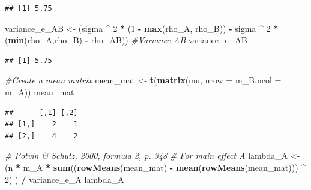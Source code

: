 \documentclass[
]{book}
\newenvironment{Shaded}{\begin{snugshade}}{\end{snugshade}}
\newcommand{\CommentTok}[1]{\textcolor[rgb]{0.56,0.35,0.01}{\textit{#1}}}
\newcommand{\DataTypeTok}[1]{\textcolor[rgb]{0.13,0.29,0.53}{#1}}
\newcommand{\DecValTok}[1]{\textcolor[rgb]{0.00,0.00,0.81}{#1}}
\newcommand{\KeywordTok}[1]{\textcolor[rgb]{0.13,0.29,0.53}{\textbf{#1}}}
\newcommand{\NormalTok}[1]{#1}
\newcommand{\OperatorTok}[1]{\textcolor[rgb]{0.81,0.36,0.00}{\textbf{#1}}}
\newcommand{\StringTok}[1]{\textcolor[rgb]{0.31,0.60,0.02}{#1}}
\begin{document}
\begin{verbatim}
## [1] 5.75
\end{verbatim}

\begin{Shaded}
\begin{Highlighting}[]
\NormalTok{variance_e_AB <-}
\StringTok{  }\NormalTok{(sigma }\OperatorTok{^}\StringTok{ }\DecValTok{2} \OperatorTok{*}\StringTok{ }\NormalTok{(}\DecValTok{1} \OperatorTok{-}\StringTok{ }\KeywordTok{max}\NormalTok{(rho_A, rho_B)) }\OperatorTok{-}\StringTok{ }
\StringTok{     }\NormalTok{sigma }\OperatorTok{^}\StringTok{ }\DecValTok{2} \OperatorTok{*}\StringTok{ }\NormalTok{(}\KeywordTok{min}\NormalTok{(rho_A,rho_B) }\OperatorTok{-}\StringTok{ }\NormalTok{rho_AB)) }
\CommentTok{#Variance AB}
\NormalTok{variance_e_AB}
\end{Highlighting}
\end{Shaded}

\begin{verbatim}
## [1] 5.75
\end{verbatim}

\begin{Shaded}
\begin{Highlighting}[]
\CommentTok{#Create a mean matrix}
\NormalTok{mean_mat <-}\StringTok{ }\KeywordTok{t}\NormalTok{(}\KeywordTok{matrix}\NormalTok{(mu, }\DataTypeTok{nrow =}\NormalTok{ m_B,}\DataTypeTok{ncol =}\NormalTok{ m_A)) }
\NormalTok{mean_mat}
\end{Highlighting}
\end{Shaded}

\begin{verbatim}
##      [,1] [,2]
## [1,]    2    1
## [2,]    4    2
\end{verbatim}

\begin{Shaded}
\begin{Highlighting}[]
\CommentTok{# Potvin & Schutz, 2000, formula 2, p. 348}
\CommentTok{# For main effect A}
\NormalTok{lambda_A <-}
\StringTok{  }\NormalTok{(n }\OperatorTok{*}\StringTok{ }\NormalTok{m_A }\OperatorTok{*}\StringTok{ }\KeywordTok{sum}\NormalTok{((}\KeywordTok{rowMeans}\NormalTok{(mean_mat) }\OperatorTok{-}\StringTok{ }
\StringTok{                   }\KeywordTok{mean}\NormalTok{(}\KeywordTok{rowMeans}\NormalTok{(mean_mat))) }\OperatorTok{^}\StringTok{ }\DecValTok{2}\NormalTok{) ) }\OperatorTok{/}\StringTok{ }\NormalTok{variance_e_A}
\NormalTok{  lambda_A}
\end{Highlighting}
\end{Shaded}
\end{document}
